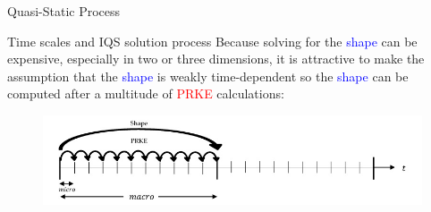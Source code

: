 \documentclass[8pt,xcolor=dvipnames]{beamer}
\newcommand{\tcr}[1]{\textcolor{red}{#1}}
\newcommand{\tcb}[1]{\textcolor{blue}{#1}}
\begin{document}
\begin{frame}{Quasi-Static Process}

\begin{block}{Time scales and IQS solution process}
Because solving for the \tcb{shape} can be expensive, especially in two or three dimensions, it is attractive to make the assumption that the \tcb{shape} is weakly time-dependent so the \tcb{shape} can be computed after a multitude of \tcr{PRKE} calculations:
\begin{figure}
\includegraphics[width=\linewidth]{figures/IQS_visualization.jpg}
\end{figure}
\end{block}


\end{frame}
\end{document}
